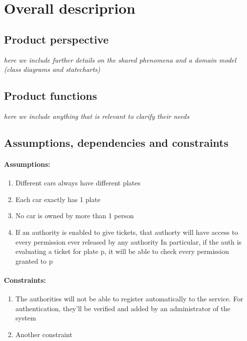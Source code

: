 \documentclass{article}
\newcommand{\enum}[1]{\texttt{#1.\arabic*}}
\begin{document}
\section{Overall descriprion}
	\subsection{Product perspective} \textit{here we include further details on the shared phenomena and a domain model (class diagrams and statecharts)}
	\subsection{Product functions}\textit{here we include anything that is relevant to clarify their needs}
	\subsection{Assumptions, dependencies and constraints}
	\paragraph{Assumptions:}
	\begin{enumerate}[label=\enum{A}]
		\item \label{A_disjPlates} Different cars always have different plates
		\item \label{A_Single plate}Each car exactly has 1 plate
		\item \label{A_singleOwner}No car is owned by more than 1 person
		\item \label{A_accessiblePermissions}If an authority is enabled to give tickets, that authorty will have access to every permission ever released by any authority
			\subitem In particular, if the auth is evaluating a ticket for plate p, it will be able to check every permission granted to p
	\end{enumerate}
	\paragraph{Constraints:}
	\begin{enumerate}[label=\enum{C}]
		\item The authorities will not be able to register automatically to the service. For authentication, they'll be verified and added by an administrator of the system
		\item Another constraint
	\end{enumerate}
\end{document}
